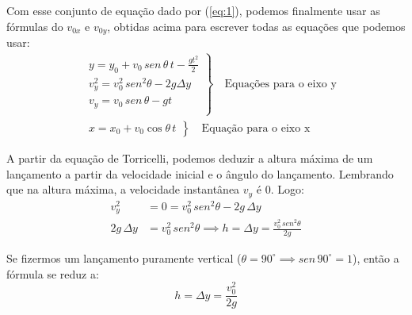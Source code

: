 \documentclass[12pt]{extarticle}
\newcommand{\<}{\langle}
\renewcommand{\>}{\rangle}
\theoremstyle{definition}
\begin{document}
Com esse conjunto de equação dado por (\ref{eq:1}), podemos finalmente usar as fórmulas do $v_{0x}$ e $v_{0y}$, obtidas acima para escrever todas as equações que podemos usar:
\begin{equation}
    \boxed{\begin{split}
        &\left.\begin{array}{lcr}
            y = y_0 + v_0\,sen\,\theta\,t - \frac{gt^2}{2}\\
        v_y^2 = v_0^2\,sen^2\theta -2g\Delta y\\
        v_y = v_{0}\,sen\, \theta -gt\\
        \end{array}\right\} \quad\text{Equações para o eixo y}
        \\
        &\left.\begin{array}{lcr}
            x = x_0 + v_{0}\cos\theta\, t 
        \end{array}\right\}\quad \text{Equação para o eixo x}
    \end{split}}
\end{equation}

A partir da equação de Torricelli, podemos deduzir a altura máxima de um lançamento a partir da velocidade inicial e o ângulo do lançamento. Lembrando que na altura máxima, a velocidade instantânea $v_y$ é 0. Logo:
\begin{equation}
    \begin{split}
        v_y^2 &= 0 = v_0^2\,sen^2\theta -2g\,\Delta y \\
        2g\,\Delta y &= v_0^2\,sen^2\theta \implies \boxed{h =\Delta y = \frac{v_0^2\, sen^2\theta}{2g}}
    \end{split}
\end{equation}

Se fizermos um lançamento puramente vertical ($\theta =90^\circ \implies sen\,90^\circ = 1$), então a fórmula se reduz a:
\begin{equation}
    h = \Delta y = \frac{v_0^2}{2g}
\end{equation}
\end{document}
